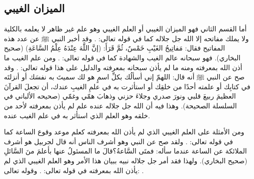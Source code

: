 
\subsection{الميزان الغيبي}

أما القسم الثاني فهو الميزان الغيبي أو العلم الغيبي وهو علم غير ظاهر لا يعلمه بالكلية ولا يملك مفاتحه إلا الله جل جلاله كما في قوله تعالى: 
\quranayah*[6][59]{\footnotesize \surahname*[6]}. وقد أخبر النبي ﷺ عن عدد هذه المفاتيح فقال: مَفاتِيحُ الغَيْبِ خَمْسٌ، ثُمَّ قَرَأَ: (إنَّ اللَّهَ عِنْدَهُ عِلْمُ السَّاعَةِ) {\footnotesize (صحيح البخاري)}. فهو سبحانه  عالم الغيب والشهادة كما في قوله تعالى: 
\quranayah*[59][22]{\footnotesize \surahname*[59]}. ومن علم الغيب ما أذن الله بمعرفته ومنه ما لم يأذن سبحانه بمعرفته والدليل على هذا قوله تعالى: 
\quranayah*[72][26-27]{\footnotesize \surahname*[72]}. وقد صح عن النبي ﷺ أنه قال: اللهمّ إني أسألُك بكلِّ اسمٍ هو لك سميتَ به نفسَك أو أنزلتَه في كتابِك أو علمته أحدًا من خلقِك أو استأثرت به في علمِ الغيبِ عندك، أن تجعلَ القرآنَ العظيمَ ربيعَ قلبي ونورَ صدري وجلاءَ حزني وذهابَ همّي وغمّي {\footnotesize (صحيحه الألباني في السلسلة الصحيحة)}. وهذا فيه أن الله جل جلاله عنده علم لم يأذن بمعرفته لأحد من خلقه وهو العلم الذي استأثر به في علم الغيب عنده.

ومن الأمثلة على العلم الغيبي الذي لم يأذن الله بمعرفته كعلم موعد وقوع الساعة كما في قوله تعالى: 
\quranayah*[33][63]{\footnotesize \surahname*[33]}.
ولقد صح عن النبي وهو أشرف الناس أنه قال لجربيل هو أشرف الملائكة عن الساعة عندما سأله: فمتَى السَّاعةُ؟قالَ ما المسئولُ عنها بأعلمَ منَ السَّائلِ {\footnotesize (صحيح البخاري)}. ولهذا فقد أمر جل جلاله نبيه ببيان هذا الأمر وهو العلم الغيبي الذي لم يأذن الله بمعرفته في قوله تعالى:
\quranayah*[6][50]{\footnotesize \surahname*[6]}. وقوله تعالى:
\quranayah*[7][188]{\footnotesize \surahname*[7]}.

